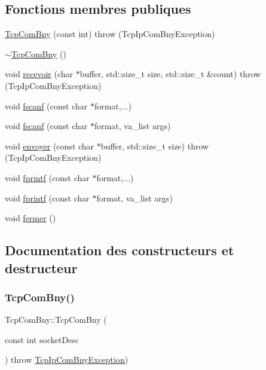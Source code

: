 \subsection*{Fonctions membres publiques}
\begin{DoxyCompactItemize}
\item 
\hyperlink{classTcpComBny_a657396bbd748486fcdf0017ea49591e6}{Tcp\+Com\+Bny} (const int)  throw (\+Tcp\+Ip\+Com\+Bny\+Exception)
\item 
\hyperlink{classTcpComBny_ab4aec67058de5219876f7093c9f84353}{$\sim$\+Tcp\+Com\+Bny} ()
\item 
void \hyperlink{classTcpComBny_a1f1002ef6d3d9cfe4cfcef4cfa3ab020}{recevoir} (char $\ast$buffer, std\+::size\+\_\+t size, std\+::size\+\_\+t \&count)  throw (\+Tcp\+Ip\+Com\+Bny\+Exception)
\item 
void \hyperlink{classTcpComBny_a44a7024cd03e4fba6090026d3a1665e6}{fscanf} (const char $\ast$format,...)
\item 
void \hyperlink{classTcpComBny_a06926f8731f185ab970fa0cb687bdf28}{fscanf} (const char $\ast$format, va\+\_\+list args)
\item 
void \hyperlink{classTcpComBny_abe45becb6b9d1605e2d9433bd784024a}{envoyer} (const char $\ast$buffer, std\+::size\+\_\+t size)  throw (\+Tcp\+Ip\+Com\+Bny\+Exception)
\item 
void \hyperlink{classTcpComBny_a7ee3d2a069a30b89626793f881df6f53}{fprintf} (const char $\ast$format,...)
\item 
void \hyperlink{classTcpComBny_a9fd438f60e9c6f606ed7730c2a17a0fa}{fprintf} (const char $\ast$format, va\+\_\+list args)
\item 
void \hyperlink{classTcpComBny_a5c12a58e106149b561fd5438d1a953d2}{fermer} ()
\end{DoxyCompactItemize}


\subsection{Documentation des constructeurs et destructeur}
\mbox{\label{classTcpComBny_a657396bbd748486fcdf0017ea49591e6}} 
\subsubsection{\texorpdfstring{Tcp\+Com\+Bny()}{TcpComBny()}}
{\footnotesize\ttfamily Tcp\+Com\+Bny\+::\+Tcp\+Com\+Bny (\begin{DoxyParamCaption}\item[{const int}]{socket\+Desc }\end{DoxyParamCaption}) throw  \hyperlink{classTcpIpComBnyException}{Tcp\+Ip\+Com\+Bny\+Exception}) }

